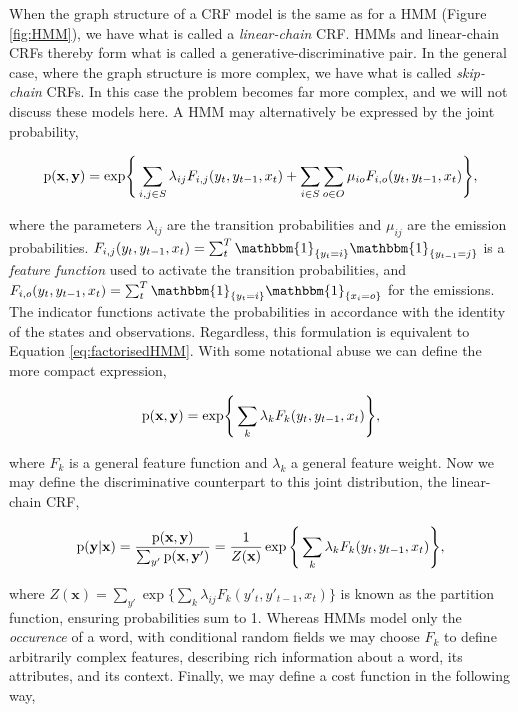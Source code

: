When the graph structure of a CRF model is the same as for a HMM (Figure \ref{fig:HMM}), we have what is called a \emph{linear-chain} CRF. HMMs and linear-chain CRFs thereby form what is called a generative-discriminative pair. In the general case, where the graph structure is more complex, we have what is called \emph{skip-chain} CRFs. In this case the problem becomes far more complex, and we will not discuss these models here. A HMM may alternatively be expressed by the joint probability,

\begin{equation}
\text{p}(\textbf{x}, \textbf{y}) = \text{exp} \Bigg\{
\sum_{i, j \in S}{
\lambda_{ij}F_{i,j}(y_t, y_{t-1}, x_t)
}
+
\sum_{i \in S}\sum_{o \in O}{
\mu_{io}F_{i,o}(y_t, y_{t-1}, x_t)
}
\Bigg\},
\label{eq:jointcrf}
\end{equation}

where the parameters $\lambda_{ij}$ are the transition probabilities and $\mu_{ij}$ are the emission probabilities. $F_{i,j}(y_t, y_{t-1}, x_t) = \sum_t^T\mathbbm{1}_{\{y_t = i\}}\mathbbm{1}_{\{y_{t-1} = j\}}$ is a \emph{feature function} used to activate the transition probabilities, and $F_{i,o}(y_t, y_{t-1}, x_t) = \sum_t^T\mathbbm{1}_{\{y_t = i\}}\mathbbm{1}_{\{x_{i} = o\}}$ for the emissions. The indicator functions activate the probabilities in accordance with the identity of the states and observations. Regardless, this formulation is equivalent to Equation \ref{eq:factorisedHMM}. With some notational abuse we can define the more compact expression,

\begin{equation}
\text{p}(\textbf{x}, \textbf{y}) = \text{exp} \Bigg\{\sum_k{
\lambda_{k}F_{k}(y_t, y_{t-1}, x_t)
}\Bigg\},
\label{eq:jointcrfcompact}
\end{equation}

where $F_k$ is a general feature function and $\lambda_k$ a general feature weight. Now we may define the discriminative counterpart to this joint distribution, the linear-chain CRF,

\begin{equation}
\text{p}(\textbf{y}|\textbf{x}) = \frac{\text{p}(\textbf{x}, \textbf{y})}{\sum_{y'}{\text{p}(\textbf{x}, \textbf{y}')}} = \frac{1}{Z(\mathbf{x})}\exp \Bigg\{\sum_k{
\lambda_{k}F_{k}(y_t, y_{t-1}, x_t)
}\Bigg\},
\end{equation}

where $Z(\mathbf{x}) = \sum_{y'}\exp \Big\{\sum_k{\lambda_{ij}F_{k}(y'_t, y'_{t-1}, x_t)}\Big\}$ is known as the partition function, ensuring probabilities sum to 1. Whereas HMMs model only the \emph{occurence} of a word, with conditional random fields we may choose $F_k$ to define arbitrarily complex features, describing rich information about a word, its attributes, and its context. Finally, we may define a cost function in the following way,

